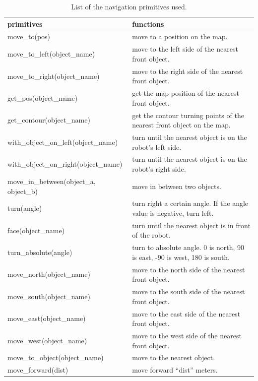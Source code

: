 \documentclass[letterpaper, 10 pt, conference]{ieeeconf}  %
\begin{document}
\begin{table}[h]
\begin{tabularx}{0.45\textwidth}{l|X}
    primitives          & functions                       \\
\midrule
move\_to(pos)          & move to a position on the map.    \\
\rowcolor{light-gray}
move\_to\_left(object\_name)          & move to the left side of the nearest front object.    \\
move\_to\_right(object\_name)         & move to the right side of the nearest front object.    \\
\rowcolor{light-gray}
get\_pos(object\_name)                & get the map position of the nearest front object.    \\
get\_contour(object\_name)           & get the contour turning points of the nearest front object on the map.   \\
\rowcolor{light-gray}
with\_object\_on\_left(object\_name)  & turn until the nearest object is on the robot's left side.     \\
with\_object\_on\_right(object\_name)  & turn until the nearest object is on the robot's right side.  \\
\rowcolor{light-gray}
move\_in\_between(object\_a, object\_b) & move in between two objects. \\
turn(angle)           & turn right a certain angle. If the angle value is negative, turn left.  \\
\rowcolor{light-gray}
face(object\_name)           & turn until the nearest object is in front of the robot. \\
turn\_absolute(angle)           & turn to absolute angle. 0 is north, 90 is east, -90 is west, 180 is south. \\
\rowcolor{light-gray}
move\_north(object\_name)       & move to the north side of the nearest front object. \\
move\_south(object\_name)       & move to the south side of the nearest front object. \\
\rowcolor{light-gray}
move\_east(object\_name)       & move to the east side of the nearest front object. \\
move\_west(object\_name)       & move to the west side of the nearest front object. \\
\rowcolor{light-gray}
move\_to\_object(object\_name)       & move to the nearest object. \\
move\_forward(dist)       & move forward ``dist'' meters. \\

  \bottomrule
  \end{tabularx}
  \caption{List of the navigation primitives used.}
  \label{table:nav_primitives}
\end{table}
\end{document}
